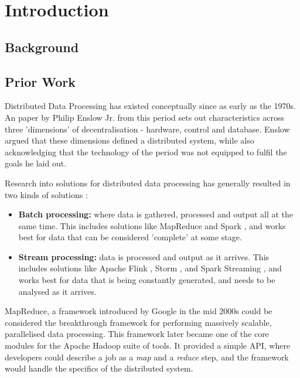 \chapter{Introduction}


\section{Background}


\section{Prior Work}

Distributed Data Processing has existed conceptually since as early as the 1970s. An paper by Philip Enslow Jr. from this period \cite{enslow1978distributed} sets out characteristics across three 'dimensions' of decentralisation - hardware, control and database. Enslow argued that these dimensions defined a distributed system, while also acknowledging that the technology of the period was not equipped to fulfil the goals he laid out.

Research into solutions for distributed data processing has generally resulted in two kinds of solutions \cite{yaqoob2016big}:
\begin{itemize}
	\item \textbf{Batch processing:} where data is gathered, processed and output all at the same time. This includes solutions like MapReduce \cite{dean2008mapreduce} and Spark \cite{zaharia2016spark}, and works best for data that can be considered 'complete' at some stage.
	\item \textbf{Stream processing:} data is processed and output as it arrives. This includes solutions like Apache Flink \cite{carbone2015flink}, Storm \cite{toshniwal2014storm}, and Spark Streaming \cite{armbrust2018sparkstreaming}, and works best for data that is being constantly generated, and needs to be analysed as it arrives.
\end{itemize}

MapReduce, a framework introduced by Google \cite{dean2008mapreduce} in the mid 2000s could be considered the breakthrough framework for performing massively scalable, parallelised data processing. This framework later became one of the core modules for the Apache Hadoop suite of tools. It provided a simple API, where developers could describe a job as a \textit{map} and a \textit{reduce} step, and the framework would handle the specifics of the distributed system. 

